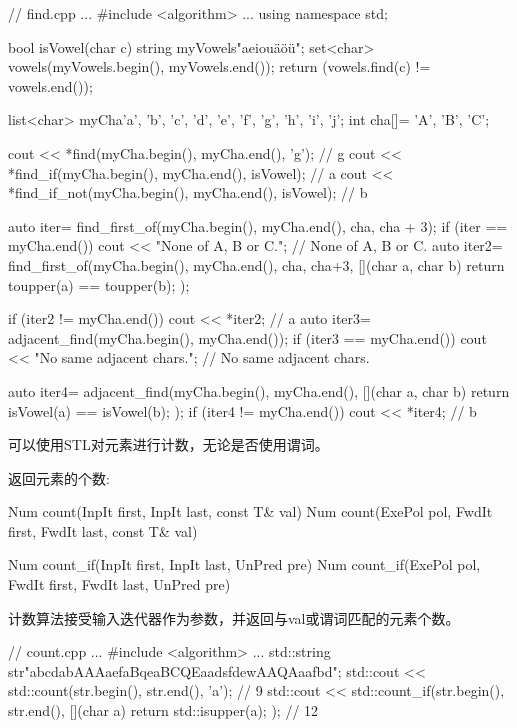 \begin{cpp}
// find.cpp
...
#include <algorithm>
...
using namespace std;

bool isVowel(char c){
	string myVowels{"aeiouäöü"};
	set<char> vowels(myVowels.begin(), myVowels.end());
	return (vowels.find(c) != vowels.end());
}

list<char> myCha{'a', 'b', 'c', 'd', 'e', 'f', 'g', 'h', 'i', 'j'};
int cha[]= {'A', 'B', 'C'};

cout << *find(myCha.begin(), myCha.end(), 'g'); // g
cout << *find_if(myCha.begin(), myCha.end(), isVowel); // a
cout << *find_if_not(myCha.begin(), myCha.end(), isVowel); // b

auto iter= find_first_of(myCha.begin(), myCha.end(), cha, cha + 3);
if (iter == myCha.end()) cout << "None of A, B or C."; // None of A, B or C.
auto iter2= find_first_of(myCha.begin(), myCha.end(), cha, cha+3,
				[](char a, char b){ return toupper(a) == toupper(b); });
				
if (iter2 != myCha.end()) cout << *iter2; // a
auto iter3= adjacent_find(myCha.begin(), myCha.end());
if (iter3 == myCha.end()) cout << "No same adjacent chars.";
										// No same adjacent chars.
										
auto iter4= adjacent_find(myCha.begin(), myCha.end(),
				[](char a, char b){ return isVowel(a) == isVowel(b); });
if (iter4 != myCha.end()) cout << *iter4; // b
\end{cpp}


可以使用STL对元素进行计数，无论是否使用谓词。

返回元素的个数:

\begin{cpp}
Num count(InpIt first, InpIt last, const T& val)
Num count(ExePol pol, FwdIt first, FwdIt last, const T& val)

Num count_if(InpIt first, InpIt last, UnPred pre)
Num count_if(ExePol pol, FwdIt first, FwdIt last, UnPred pre)
\end{cpp}

计数算法接受输入迭代器作为参数，并返回与val或谓词匹配的元素个数。


\begin{cpp}
// count.cpp
...
#include <algorithm>
...
std::string str{"abcdabAAAaefaBqeaBCQEaadsfdewAAQAaafbd"};
std::cout << std::count(str.begin(), str.end(), 'a'); // 9
std::cout << std::count_if(str.begin(), str.end(),
							[](char a){ return std::isupper(a); }); // 12
\end{cpp}


